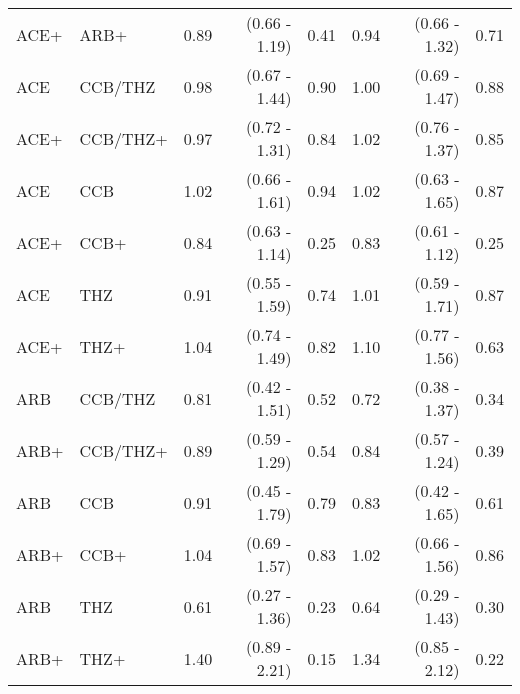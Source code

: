 \documentclass[11pt,]{article}
\begin{document}
\begin{table}[H]
{\begin{tabular}{llrrrrrr}
  ACE+ & ARB+ & 0.89 & (0.66 - 1.19) & 0.41 & 0.94 & (0.66 - 1.32) & 0.71 \\ 
  ACE & CCB/THZ & 0.98 & (0.67 - 1.44) & 0.90 & 1.00 & (0.69 - 1.47) & 0.88 \\ 
  ACE+ & CCB/THZ+ & 0.97 & (0.72 - 1.31) & 0.84 & 1.02 & (0.76 - 1.37) & 0.85 \\ 
  ACE & CCB & 1.02 & (0.66 - 1.61) & 0.94 & 1.02 & (0.63 - 1.65) & 0.87 \\ 
  ACE+ & CCB+ & 0.84 & (0.63 - 1.14) & 0.25 & 0.83 & (0.61 - 1.12) & 0.25 \\ 
  ACE & THZ & 0.91 & (0.55 - 1.59) & 0.74 & 1.01 & (0.59 - 1.71) & 0.87 \\ 
  ACE+ & THZ+ & 1.04 & (0.74 - 1.49) & 0.82 & 1.10 & (0.77 - 1.56) & 0.63 \\ 
  ARB & CCB/THZ & 0.81 & (0.42 - 1.51) & 0.52 & 0.72 & (0.38 - 1.37) & 0.34 \\ 
  ARB+ & CCB/THZ+ & 0.89 & (0.59 - 1.29) & 0.54 & 0.84 & (0.57 - 1.24) & 0.39 \\ 
  ARB & CCB & 0.91 & (0.45 - 1.79) & 0.79 & 0.83 & (0.42 - 1.65) & 0.61 \\ 
  ARB+ & CCB+ & 1.04 & (0.69 - 1.57) & 0.83 & 1.02 & (0.66 - 1.56) & 0.86 \\ 
  ARB & THZ & 0.61 & (0.27 - 1.36) & 0.23 & 0.64 & (0.29 - 1.43) & 0.30 \\ 
  ARB+ & THZ+ & 1.40 & (0.89 - 2.21) & 0.15 & 1.34 & (0.85 - 2.12) & 0.22 \\ 
    \bottomrule
  \end{tabular}
  }
\end{table}
\end{document}
